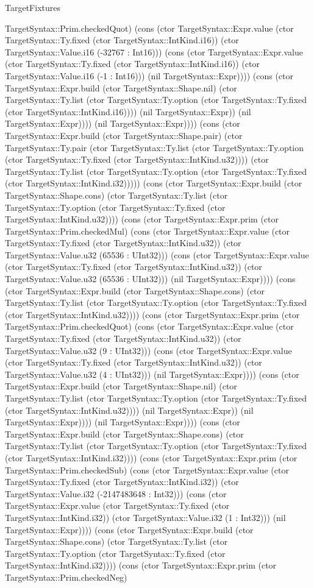 \begin{lexlean}{TargetFixtures}
\begin{semanticmodule}
{TargetSyntax::Prim.checkedQuot) (cons (ctor TargetSyntax::Expr.value (ctor TargetSyntax::Ty.fixed (ctor TargetSyntax::IntKind.i16)) (ctor TargetSyntax::Value.i16 (-32767 : Int16))) (cons (ctor TargetSyntax::Expr.value (ctor TargetSyntax::Ty.fixed (ctor TargetSyntax::IntKind.i16)) (ctor TargetSyntax::Value.i16 (-1 : Int16))) (nil TargetSyntax::Expr)))) (cons (ctor TargetSyntax::Expr.build (ctor TargetSyntax::Shape.nil) (ctor TargetSyntax::Ty.list (ctor TargetSyntax::Ty.option (ctor TargetSyntax::Ty.fixed (ctor TargetSyntax::IntKind.i16)))) (nil TargetSyntax::Expr)) (nil TargetSyntax::Expr)))) (nil TargetSyntax::Expr)))) (cons (ctor TargetSyntax::Expr.build (ctor TargetSyntax::Shape.pair) (ctor TargetSyntax::Ty.pair (ctor TargetSyntax::Ty.list (ctor TargetSyntax::Ty.option (ctor TargetSyntax::Ty.fixed (ctor TargetSyntax::IntKind.u32)))) (ctor TargetSyntax::Ty.list (ctor TargetSyntax::Ty.option (ctor TargetSyntax::Ty.fixed (ctor TargetSyntax::IntKind.i32))))) (cons (ctor TargetSyntax::Expr.build (ctor TargetSyntax::Shape.cons) (ctor TargetSyntax::Ty.list (ctor TargetSyntax::Ty.option (ctor TargetSyntax::Ty.fixed (ctor TargetSyntax::IntKind.u32)))) (cons (ctor TargetSyntax::Expr.prim (ctor TargetSyntax::Prim.checkedMul) (cons (ctor TargetSyntax::Expr.value (ctor TargetSyntax::Ty.fixed (ctor TargetSyntax::IntKind.u32)) (ctor TargetSyntax::Value.u32 (65536 : UInt32))) (cons (ctor TargetSyntax::Expr.value (ctor TargetSyntax::Ty.fixed (ctor TargetSyntax::IntKind.u32)) (ctor TargetSyntax::Value.u32 (65536 : UInt32))) (nil TargetSyntax::Expr)))) (cons (ctor TargetSyntax::Expr.build (ctor TargetSyntax::Shape.cons) (ctor TargetSyntax::Ty.list (ctor TargetSyntax::Ty.option (ctor TargetSyntax::Ty.fixed (ctor TargetSyntax::IntKind.u32)))) (cons (ctor TargetSyntax::Expr.prim (ctor TargetSyntax::Prim.checkedQuot) (cons (ctor TargetSyntax::Expr.value (ctor TargetSyntax::Ty.fixed (ctor TargetSyntax::IntKind.u32)) (ctor TargetSyntax::Value.u32 (9 : UInt32))) (cons (ctor TargetSyntax::Expr.value (ctor TargetSyntax::Ty.fixed (ctor TargetSyntax::IntKind.u32)) (ctor TargetSyntax::Value.u32 (4 : UInt32))) (nil TargetSyntax::Expr)))) (cons (ctor TargetSyntax::Expr.build (ctor TargetSyntax::Shape.nil) (ctor TargetSyntax::Ty.list (ctor TargetSyntax::Ty.option (ctor TargetSyntax::Ty.fixed (ctor TargetSyntax::IntKind.u32)))) (nil TargetSyntax::Expr)) (nil TargetSyntax::Expr)))) (nil TargetSyntax::Expr)))) (cons (ctor TargetSyntax::Expr.build (ctor TargetSyntax::Shape.cons) (ctor TargetSyntax::Ty.list (ctor TargetSyntax::Ty.option (ctor TargetSyntax::Ty.fixed (ctor TargetSyntax::IntKind.i32)))) (cons (ctor TargetSyntax::Expr.prim (ctor TargetSyntax::Prim.checkedSub) (cons (ctor TargetSyntax::Expr.value (ctor TargetSyntax::Ty.fixed (ctor TargetSyntax::IntKind.i32)) (ctor TargetSyntax::Value.i32 (-2147483648 : Int32))) (cons (ctor TargetSyntax::Expr.value (ctor TargetSyntax::Ty.fixed (ctor TargetSyntax::IntKind.i32)) (ctor TargetSyntax::Value.i32 (1 : Int32))) (nil TargetSyntax::Expr)))) (cons (ctor TargetSyntax::Expr.build (ctor TargetSyntax::Shape.cons) (ctor TargetSyntax::Ty.list (ctor TargetSyntax::Ty.option (ctor TargetSyntax::Ty.fixed (ctor TargetSyntax::IntKind.i32)))) (cons (ctor TargetSyntax::Expr.prim (ctor TargetSyntax::Prim.checkedNeg) }
\end{semanticmodule}
\end{lexlean}
